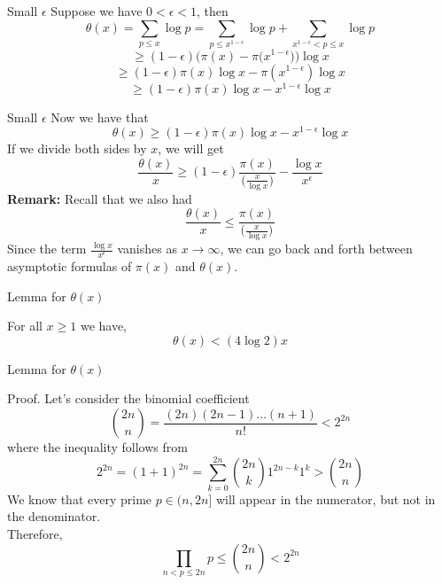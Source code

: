 \documentclass[18pt]{beamer}
\begin{document}
\begin{frame}{Small $\epsilon$}
    Suppose we have $0 < \epsilon < 1$, then
    \vspace{1em}
    \[\theta(x) = \sum\limits_{p \leq x} \log{p} = \sum\limits_{p \leq x^{1-\epsilon}} \log{p} + \sum\limits_{x ^{1 -\epsilon} < p \leq x} \log{p}\]
    \pause{}
    \[\geq (1-\epsilon)\Big(\pi(x)-\pi\big(x^{1-\epsilon}\big)\Big)\log{x}\]
    \pause{}
    \[\geq (1-\epsilon) \pi(x) \log{x} - \pi(x^{1-\epsilon}) \log{x}\]
    \pause{}
    \[\geq (1 - \epsilon) \pi(x)\log{x} - x^{1-\epsilon}\log{x}\]

\end{frame}

\begin{frame}{Small $\epsilon$}
    Now we have that
    \[\theta(x) \geq (1 - \epsilon) \pi(x)\log{x} - x^{1-\epsilon}\log{x}\]
    \pause{}
    If we divide both sides by $x$, we will get
    \[\frac{\theta(x)}{x} \geq (1-\epsilon)\frac{\pi(x)}{\big(\frac{x}{\log{x}}\big)} - \frac{\log{x}}{x^{\epsilon}}\]
    \pause{}
    \textbf{Remark:} Recall that we also had
  \[\frac{\theta(x)}{x} \leq \frac{\pi(x)}{\big(\frac{x}{\log{x}}\big)}\]
    Since the term $\frac{\log{x}}{x^{\epsilon} }$ vanishes as $x \rightarrow \infty$, we can go back and forth between asymptotic formulas of $\pi(x)$ and $\theta(x)$.

\end{frame}

\begin{frame}{Lemma for $\theta(x)$}
    \begin{Lemma}
        For all $x \geq 1$ we have,
        \[\theta(x) < (4\log{2})x\]
    \end{Lemma}
\end{frame}

\begin{frame}{Lemma          for $\theta(x)$}
    \begin{block}{Proof.}
        Let's consider the binomial coefficient
        \[{2n \choose n} = \frac{(2n)(2n-1)\ldots(n+1)}{n!} < 2^{2n} \]
        \pause{}
        where the inequality follows from
    \[2^{2n} = (1+1)^{2n} = \sum\limits_{k = 0} ^{2n} {2n \choose k}1^{2n-k}1^{k} > {2n \choose n}\]
        \pause{}
        We know that every prime $p \in (n, 2n]$ will appear in the numerator, but not in the denominator.\\
        \pause{}
        Therefore,
        \[\prod\limits_{n < p \leq 2n} p \leq {2n \choose n} < 2^{2n}\]
    \end{block}
\end{frame}
\end{document}
